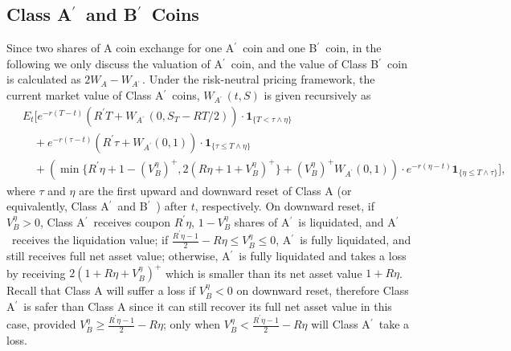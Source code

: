 \documentclass[draft, noinfoline]{ectaart}
\numberwithin{equation}{section}
\theoremstyle{plain}
\newcommand{\Ap}{A\ensuremath{^\prime}~}
\newcommand{\Bp}{B\ensuremath{^\prime}~}
\begin{document}
\subsection{\texorpdfstring{Class \Ap and \Bp Coins}{Lg}}
Since two shares of A coin exchange for one \Ap coin and one \Bp coin, in the following we only discuss the valuation of \Ap coin, and the value of Class \Bp coin is calculated as $2W_A-W_{\Ap}$. Under the risk-neutral pricing framework, the current market value of Class \Ap coins, $W_{\Ap}(t,S)$ is given recursively as
\begin{equation}    \label{VAL3}
\begin{split}
 &~ E_{t}\Bigg[e^{-r(T-t)}(R^\prime T+W_{\Ap}(0,S_T-RT/2))\cdot\mathbf{1}_{\{T<\tau\land\eta\}}\\
 &~\quad +e^{-r(\tau-t)}(R^\prime\tau+W_{A^\prime}(0,1))\cdot\mathbf{1}_{\{\tau\le T\land \eta\}}\\
 &~ \quad + \left(\min\{R^\prime\eta+1-(V_{B}^{\eta})^+,2(R\eta+1+V_B^{\eta})^+\}+(V_{B}^{\eta})^+W_{A^\prime}(0,1)\right) \cdot e^{-r(\eta-t)} \mathbf{1}_{\{\eta\le T\land\tau\}}\Bigg],
\end{split}
\end{equation}
where $\tau$ and $\eta$ are the first upward and downward reset of Class A (or equivalently, Class \Ap and \Bp) after $t$, respectively. On downward reset, if $V_B^{\eta}>0$, Class \Ap receives coupon $R^\prime\eta$, $1-V_B^{\eta}$ shares of \Ap is liquidated, and \Ap receives the liquidation value; if $\frac{R^\prime\eta-1}{2}-R\eta\le V_B^{\eta}\le 0$, \Ap is fully liquidated, and still receives full net asset value; otherwise, \Ap is fully liquidated and takes a loss by receiving $2(1+R\eta+V_B^{\eta})^+$ which is smaller than its net asset value $1+R\eta$. Recall that Class A will suffer a loss if $V_B^\eta<0$ on downward reset, therefore Class \Ap is safer than Class A since it can still recover its full net asset value in this case, provided $V_B^{\eta}\ge \frac{R^\prime\eta-1}{2}-R\eta$; only when $V_B^{\eta}< \frac{R^\prime\eta-1}{2}-R\eta$ will Class \Ap take a loss.
\end{document}
